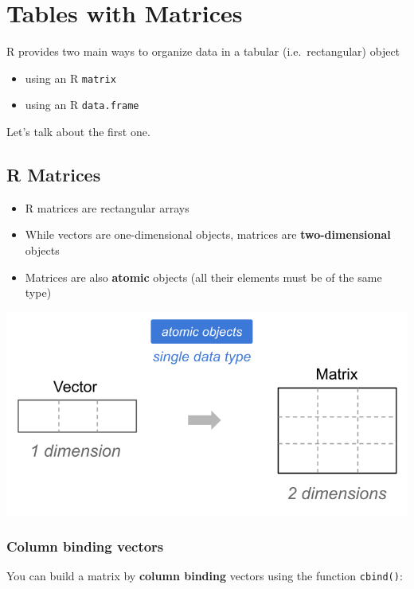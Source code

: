 \documentclass[
]{book}
\begin{document}
\hypertarget{tables-with-matrices}{%
\section{Tables with Matrices}\label{tables-with-matrices}}

R provides two main ways to organize data in a tabular (i.e.~rectangular) object

\begin{itemize}
\item
  using an R \texttt{matrix}
\item
  using an R \texttt{data.frame}
\end{itemize}

Let's talk about the first one.

\hypertarget{r-matrices}{%
\subsection{R Matrices}\label{r-matrices}}

\begin{itemize}
\item
  R matrices are rectangular arrays
\item
  While vectors are one-dimensional objects, matrices are \textbf{two-dimensional}
  objects
\item
  Matrices are also \textbf{atomic} objects (all their elements must
  be of the same type)
\end{itemize}

\begin{center}\includegraphics[width=0.6\linewidth]{images/objects/data-vector-matrix} \end{center}

\hypertarget{column-binding-vectors}{%
\subsubsection*{Column binding vectors}\label{column-binding-vectors}}

You can build a matrix by \textbf{column binding} vectors using the function
\texttt{cbind()}:
\end{document}
